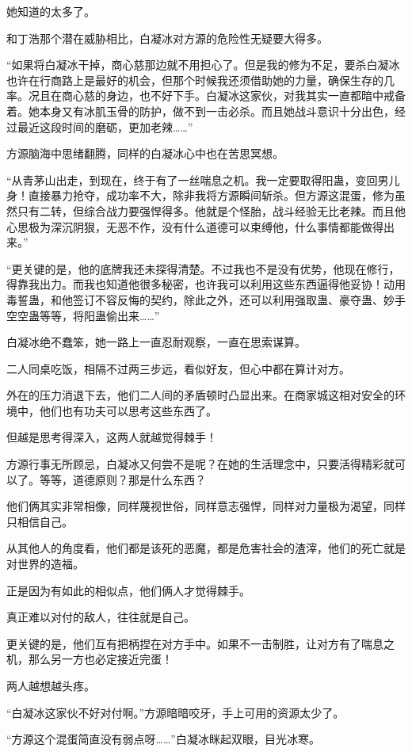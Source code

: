 \begin{this_body}
她知道的太多了。

和丁浩那个潜在威胁相比，白凝冰对方源的危险性无疑要大得多。

“如果将白凝冰干掉，商心慈那边就不用担心了。但是我的修为不足，要杀白凝冰也许在行商路上是最好的机会，但那个时候我还须借助她的力量，确保生存的几率。况且在商心慈的身边，也不好下手。白凝冰这家伙，对我其实一直都暗中戒备着。她本身又有冰肌玉骨的防护，做不到一击必杀。而且她战斗意识十分出色，经过最近这段时间的磨砺，更加老辣……”

方源脑海中思绪翻腾，同样的白凝冰心中也在苦思冥想。

“从青茅山出走，到现在，终于有了一丝喘息之机。我一定要取得阳蛊，变回男儿身！直接暴力抢夺，成功率不大，除非我将方源瞬间斩杀。但方源这混蛋，修为虽然只有二转，但综合战力要强悍得多。他就是个怪胎，战斗经验无比老辣。而且他心思极为深沉阴狠，无恶不作，没有什么道德可以束缚他，什么事情都能做得出来。”

“更关键的是，他的底牌我还未探得清楚。不过我也不是没有优势，他现在修行，得靠我出力。而我也知道他很多秘密，也许我可以利用这些东西逼得他妥协！动用毒誓蛊，和他签订不容反悔的契约，除此之外，还可以利用强取蛊、豪夺蛊、妙手空空蛊等等，将阳蛊偷出来……”

白凝冰绝不蠢笨，她一路上一直忍耐观察，一直在思索谋算。

二人同桌吃饭，相隔不过两三步远，看似好友，但心中都在算计对方。

外在的压力消退下去，他们二人间的矛盾顿时凸显出来。在商家城这相对安全的环境中，他们也有功夫可以思考这些东西了。

但越是思考得深入，这两人就越觉得棘手！

方源行事无所顾忌，白凝冰又何尝不是呢？在她的生活理念中，只要活得精彩就可以了。等等，道德原则？那是什么东西？

他们俩其实非常相像，同样蔑视世俗，同样意志强悍，同样对力量极为渴望，同样只相信自己。

从其他人的角度看，他们都是该死的恶魔，都是危害社会的渣滓，他们的死亡就是对世界的造福。

正是因为有如此的相似点，他们俩人才觉得棘手。

真正难以对付的敌人，往往就是自己。

更关键的是，他们互有把柄捏在对方手中。如果不一击制胜，让对方有了喘息之机，那么另一方也必定接近完蛋！

两人越想越头疼。

“白凝冰这家伙不好对付啊。”方源暗暗咬牙，手上可用的资源太少了。

“方源这个混蛋简直没有弱点呀……”白凝冰眯起双眼，目光冰寒。


\end{this_body}
